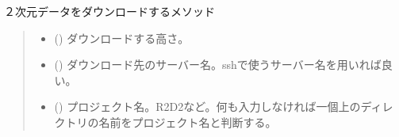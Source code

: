 \documentclass[letterpaper,10pt,dvipdfmx,report]{sphinxmanual}
\begin{document}
\begin{fulllineitems}
\label{\detokenize{io:R2D2.R2D2_data.sync_select}}
\pysigstartsignatures
{}
\pysigstopsignatures
\sphinxAtStartPar
２次元データをダウンロードするメソッド
\begin{quote}\begin{description}
\begin{itemize}
\item {} 
\sphinxAtStartPar
{} () \sphinxhyphen{}\sphinxhyphen{} ダウンロードする高さ。

\item {} 
\sphinxAtStartPar
{} () \sphinxhyphen{}\sphinxhyphen{} ダウンロード先のサーバー名。sshで使うサーバー名を用いれば良い。

\item {} 
\sphinxAtStartPar
{} () \sphinxhyphen{}\sphinxhyphen{} プロジェクト名。\textquotesingle{}R2D2\textquotesingle{}など。何も入力しなければ一個上のディレクトリの名前をプロジェクト名と判断する。

\end{itemize}

\end{description}\end{quote}

\end{fulllineitems}

\end{document}
